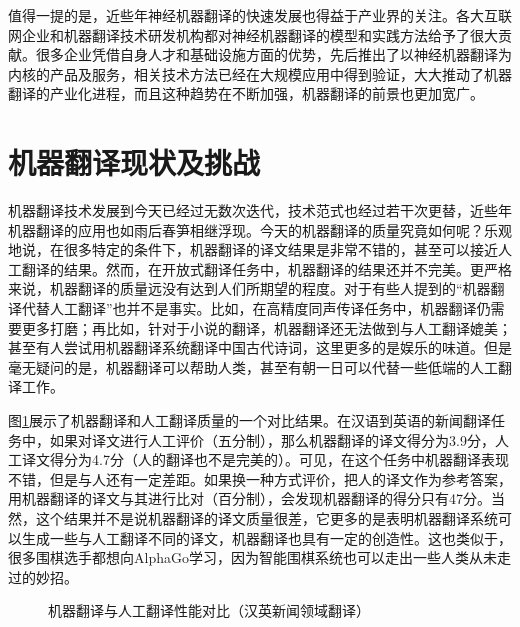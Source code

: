 \parinterval 值得一提的是，近些年神经机器翻译的快速发展也得益于产业界的关注。各大互联网企业和机器翻译技术研发机构都对神经机器翻译的模型和实践方法给予了很大贡献。很多企业凭借自身人才和基础设施方面的优势，先后推出了以神经机器翻译为内核的产品及服务，相关技术方法已经在大规模应用中得到验证，大大推动了机器翻译的产业化进程，而且这种趋势在不断加强，机器翻译的前景也更加宽广。


\sectionnewpage
\section{机器翻译现状及挑战}
\parinterval 机器翻译技术发展到今天已经过无数次迭代，技术范式也经过若干次更替，近些年机器翻译的应用也如雨后春笋相继浮现。今天的机器翻译的质量究竟如何呢？乐观地说，在很多特定的条件下，机器翻译的译文结果是非常不错的，甚至可以接近人工翻译的结果。然而，在开放式翻译任务中，机器翻译的结果还并不完美。更严格来说，机器翻译的质量远没有达到人们所期望的程度。对于有些人提到的“机器翻译代替人工翻译”也并不是事实。比如，在高精度同声传译任务中，机器翻译仍需要更多打磨；再比如，针对于小说的翻译，机器翻译还无法做到与人工翻译媲美；甚至有人尝试用机器翻译系统翻译中国古代诗词，这里更多的是娱乐的味道。但是毫无疑问的是，机器翻译可以帮助人类，甚至有朝一日可以代替一些低端的人工翻译工作。

\parinterval 图\ref{fig:1-7}展示了机器翻译和人工翻译质量的一个对比结果。在汉语到英语的新闻翻译任务中，如果对译文进行人工评价（五分制），那么机器翻译的译文得分为3.9分，人工译文得分为4.7分（人的翻译也不是完美的）。可见，在这个任务中机器翻译表现不错，但是与人还有一定差距。如果换一种方式评价，把人的译文作为参考答案，用机器翻译的译文与其进行比对（百分制），会发现机器翻译的得分只有47分。当然，这个结果并不是说机器翻译的译文质量很差，它更多的是表明机器翻译系统可以生成一些与人工翻译不同的译文，机器翻译也具有一定的创造性。这也类似于，很多围棋选手都想向AlphaGo学习，因为智能围棋系统也可以走出一些人类从未走过的妙招。

\begin{figure}[htp]
   \centering

\setlength{\belowcaptionskip}{-0.5em}
    \caption{机器翻译与人工翻译性能对比（汉英新闻领域翻译）}
    \label{fig:1-7}
\end{figure}

